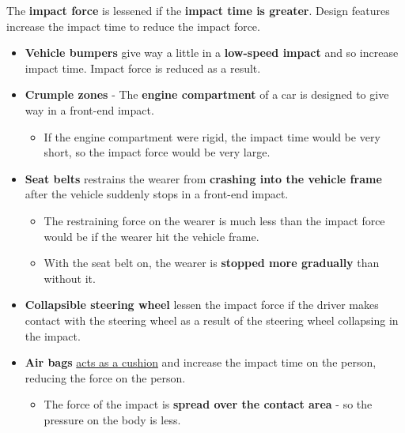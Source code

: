 The \textbf{impact force} is lessened if the \textbf{impact time is greater}. Design features increase the impact time to reduce the impact force.
\begin{itemize}
    \item \textbf{Vehicle bumpers} give way a little in a \textbf{low-speed impact} and so increase impact time. Impact force is reduced as a result.
    \item \textbf{Crumple zones} - The \textbf{engine compartment} of a car is designed to give way in a front-end impact.
        \begin{itemize}
            \item If the engine compartment were rigid, the impact time would be very short, so the impact force would be very large.
        \end{itemize}
    \item \textbf{Seat belts} restrains the wearer from \textbf{crashing into the vehicle frame} after the vehicle suddenly stops in a front-end impact.
        \begin{itemize}
            \item The restraining force on the wearer is much less than the impact force would be if the wearer hit the vehicle frame.
            \item With the seat belt on, the wearer is \textbf{stopped more gradually} than without it.
        \end{itemize}
    \item \textbf{Collapsible steering wheel} lessen the impact force if the driver makes contact with the steering wheel as a result of the steering wheel collapsing in the impact.
    \item \textbf{Air bags} \underline{acts as a cushion} and increase the impact time on the person, reducing the force on the person.
        \begin{itemize}
            \item The force of the impact is \textbf{spread over the contact area} - so the pressure on the body is less.
        \end{itemize}
\end{itemize}
